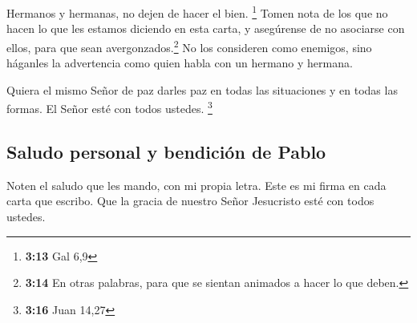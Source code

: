  Hermanos y hermanas, no dejen de hacer el bien.
\footnote{\textbf{3:13} Gal 6,9}  Tomen nota de los que
no hacen lo que les estamos diciendo en esta carta, y asegúrense de no
asociarse con ellos, para que sean avergonzados.\footnote{\textbf{3:14}
  En otras palabras, para que se sientan animados a hacer lo que deben.}
 No los consideren como enemigos, sino háganles la
advertencia como quien habla con un hermano y hermana.

 Quiera el mismo Señor de paz darles paz en todas las
situaciones y en todas las formas. El Señor esté con todos ustedes.
\footnote{\textbf{3:16} Juan 14,27}

\hypertarget{saludo-personal-y-bendiciuxf3n-de-pablo}{%
\subsection{Saludo personal y bendición de
Pablo}\label{saludo-personal-y-bendiciuxf3n-de-pablo}}

 Noten el saludo que les mando, con mi propia letra. Este
es mi firma en cada carta que escribo.  Que la gracia de
nuestro Señor Jesucristo esté con todos ustedes.
